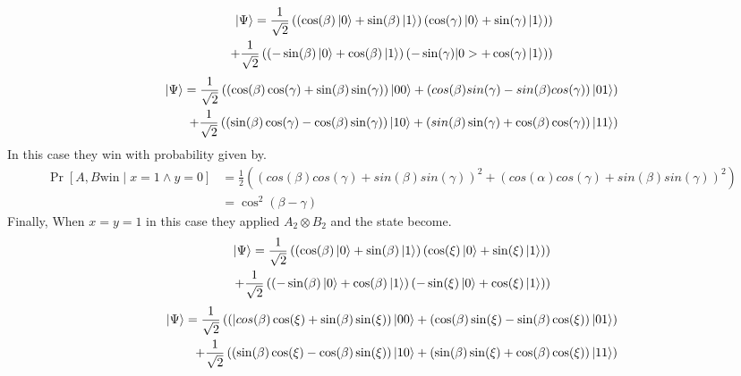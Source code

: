 \begin{equation*}
\begin{aligned}
\ket{\Psi }= \frac{1}{\sqrt{2}}\left( \left(\cos(\beta)\ket{0}+\sin(\beta)\ket{1} \right) \left(\cos(\gamma)\ket{0}+\sin(\gamma)\ket{1} \right) \right)  \\  
+  \frac{1}{\sqrt{2}} \left( \left(-\sin(\beta)\ket{0}+\cos(\beta)\ket{1} \right) \left(-\sin(\gamma)|0>+\cos(\gamma)\ket{1} \right) \right)
\end{aligned}
\end{equation*}
\begin{equation*}
\begin{aligned}
\ket{\Psi }= \frac{1}{\sqrt{2}}\left(\left(\cos(\beta) \cos(\gamma)+\sin(\beta) \sin(\gamma)\right)\ket{00}+\left( cos(\beta)  sin(\gamma)-sin(\beta)  cos(\gamma)\right)\ket{01}\right)\\
+\frac{1}{\sqrt{2}}\left( \left( \sin(\beta)  \cos(\gamma)-\cos(\beta) \sin(\gamma)\right)\ket{10}+\left(sin(\beta) \sin(\gamma)+\cos(\beta)  \cos(\gamma)\right)\ket{11}\right)
\end{aligned}
\end{equation*}
In this case they win with probability given by.
\begin{align} 
\Pr[A,B \text{win} \mid x=1 \wedge y=0]&=\frac{1}{2}\left(\left(cos(\beta) cos(\gamma)+sin(\beta)sin(\gamma)\right)^2 +\left(cos(\alpha) cos(\gamma)+sin(\beta)sin(\gamma)\right)^2  \right)\nonumber\\ 
&=\cos^2(\beta-\gamma)\label{eq4}
\end{align}
Finally, When $x=y=1$ in this case they applied $A_2\otimes B_2$ and the state become.
\begin{equation*}
\begin{aligned}
\ket{\Psi }= \frac{1}{\sqrt{2}}\left( \left(\cos(\beta)\ket{0}+\sin(\beta)\ket{1} \right) \left(\cos(\xi)\ket{0}+\sin(\xi)\ket{1} \right) \right)  \\  
+\frac{1}{\sqrt{2}} \left( \left(-\sin(\beta)\ket{0}+\cos(\beta)\ket{1} \right) \left(-\sin(\xi)\ket{0}+\cos(\xi)\ket{1} \right) \right)
\end{aligned}
\end{equation*}
\begin{equation*}
\begin{aligned}
\ket{\Psi}= \frac{1}{\sqrt{2}}\left(\left(|cos(\beta) \cos(\xi)+\sin(\beta) \sin(\xi)\right)\ket{00}+\left( \cos(\beta)  \sin(\xi)-\sin(\beta)  \cos(\xi)\right)\ket{01}\right)\\
+\frac{1}{\sqrt{2}}\left( \left( \sin(\beta)  \cos(\xi)-\cos(\beta) \sin(\xi)\right)\ket{10}+\left(\sin(\beta) \sin(\xi)+\cos(\beta)  \cos(\xi)\right)\ket{11}\right)
\end{aligned}
\end{equation*}
